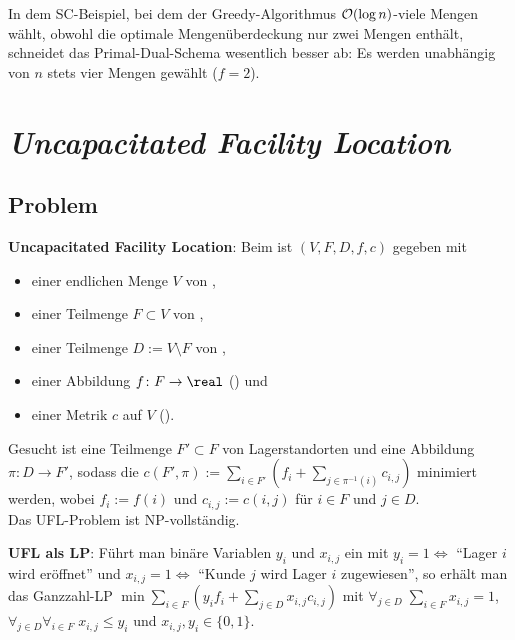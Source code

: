 \linie

In dem SC-Beispiel, bei dem der Greedy-Algorithmus $\mathcal{O}(\log n)$-viele Mengen wählt,
obwohl die optimale Mengenüberdeckung nur zwei Mengen enthält,
schneidet das Primal-Dual-Schema wesentlich besser ab:
Es werden unabhängig von $n$ stets vier Mengen gewählt
($f = 2$).

\pagebreak

\section{%
    \emph{Uncapacitated Facility Location}%
}

\subsection{%
    Problem%
}

\textbf{Uncapacitated Facility Location}:
Beim  ist $(V, F, D, f, c)$ gegeben mit
\begin{itemize}
    \item
    einer endlichen Menge $V$ von ,

    \item
    einer Teilmenge $F \subset V$ von ,

    \item
    einer Teilmenge $D := V \setminus F$ von ,

    \item
    einer Abbildung $f\colon F \to \real$ () und

    \item
    einer Metrik $c$ auf $V$ ().
\end{itemize}
Gesucht ist eine Teilmenge $F' \subset F$ von Lagerstandorten und eine Abbildung
$\pi\colon D \to F'$, sodass die 
$c(F', \pi) := \sum_{i \in F'} (f_i + \sum_{j \in \pi^{-1}(i)} c_{i,j})$ minimiert werden,
wobei $f_i := f(i)$ und $c_{i,j} := c(i, j)$ für $i \in F$ und $j \in D$.\\
Das UFL-Problem ist NP-vollständig.

\linie

\textbf{UFL als LP}:
Führt man binäre Variablen $y_i$ und $x_{i,j}$ ein mit
$y_i = 1 \iff$ "`Lager $i$ wird eröffnet"' und
$x_{i,j} = 1 \iff$ "`Kunde $j$ wird Lager $i$ zugewiesen"',
so erhält man das Ganzzahl-LP
$\min \sum_{i \in F} (y_i f_i + \sum_{j \in D} x_{i,j} c_{i,j})$ mit
$\forall_{j \in D}\; \sum_{i \in F} x_{i,j} = 1$,
$\forall_{j \in D} \forall_{i \in F}\; x_{i,j} \le y_i$ und
$x_{i,j}, y_i \in \{0, 1\}$.

